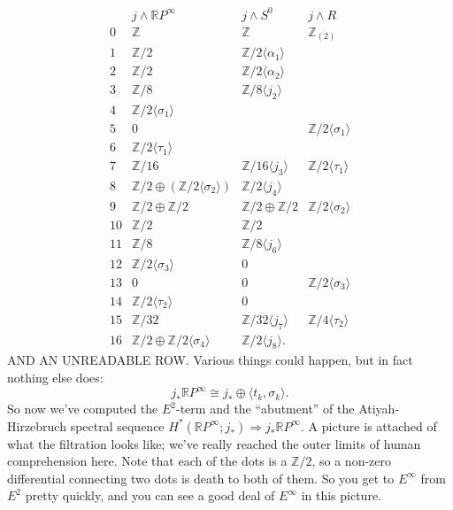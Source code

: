 \documentclass{article}
\newcommand{\Z}{\mathbb{Z}}
\newcommand{\R}{\mathbb{R}}
\newcommand{\RP}{\R P}
\newcommand{\sprod}{\wedge}
\begin{document}
\[
\begin{array}{cccc}
& j \sprod \RP^\infty & j \sprod S^0 & j \sprod R \\
0 & \Z & \Z & \Z_{(2)} \\
1 & \Z/2 & \Z/2 \langle \alpha_1 \rangle \\
2 & \Z/2 & \Z/2 \langle \alpha_2 \rangle \\
3 & \Z/8 & \Z/8 \langle j_2 \rangle \\
4 & \Z/2 \langle \sigma_1 \rangle \\
5 & 0 & & \Z/2 \langle \sigma_1 \rangle \\
6 & \Z/2 \langle \tau_1 \rangle \\
7 & \Z/16 & \Z/16 \langle j_3 \rangle & \Z/2 \langle \tau_1 \rangle \\
8 & \Z/2 \oplus (\Z/2 \langle \sigma_2 \rangle) & \Z/2 \langle j_4 \rangle \\
9 & \Z/2 \oplus \Z/2 & \Z/2 \oplus \Z/2 & \Z/2 \langle \sigma_2 \rangle \\
10 & \Z/2 & \Z/2 \\
11 & \Z/8 & \Z/8 \langle j_6 \rangle \\
12 & \Z/2 \langle \sigma_3 \rangle & 0 \\
13 & 0 & 0 & \Z/2 \langle \sigma_3 \rangle \\
14 & \Z/2 \langle \tau_2 \rangle  & 0 \\
15 & \Z/32 & \Z/32 \langle j_7 \rangle & \Z/4 \langle \tau_2 \rangle \\
16 & \Z/2 \oplus \Z/2 \langle \sigma_4 \rangle & \Z/2 \langle j_8 \rangle.
\end{array}
\]
AND AN UNREADABLE ROW.  Various things could happen, but in fact nothing else does:
\[
j_* \RP^\infty \cong j_* \oplus \langle t_k, \sigma_k \rangle.
\]
So now we've computed the $E^2$-term and the ``abutment'' of the Atiyah-Hirzebruch spectral sequence $H^*(\RP^\infty; j_*) \Rightarrow j_* \RP^\infty$.  A picture is attached of what the filtration looks like; we've really reached the outer limits of human comprehension here.  Note that each of the dots is a $\Z/2$, so a non-zero differential connecting two dots is death to both of them.  So you get to $E^\infty$ from $E^2$ pretty quickly, and you can see a good deal of $E^\infty$ in this picture.
\end{document}
